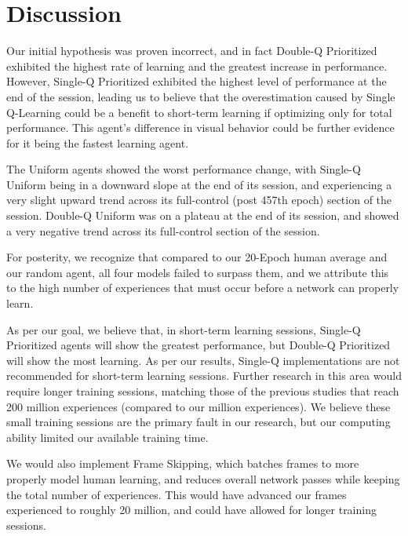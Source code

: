 \documentclass[conference]{IEEEtran}
\begin{document}
\section{Discussion}
Our initial hypothesis was proven incorrect, and in fact Double-Q Prioritized exhibited the highest rate of learning and the greatest increase in performance. However, Single-Q Prioritized exhibited the highest level of performance at the end of the session, leading us to believe that the overestimation caused by Single Q-Learning could be a benefit to short-term learning if optimizing only for total performance. This agent's difference in visual behavior could be further evidence for it being the fastest learning agent. \par
The Uniform agents showed the worst performance change, with Single-Q Uniform being in a downward slope at the end of its session, and experiencing a very slight upward trend across its full-control (post 457th epoch) section of the session. Double-Q Uniform was on a plateau at the end of its session, and showed a very negative trend across its full-control section of the session. \par
For posterity, we recognize that compared to our 20-Epoch human average and our random agent, all four models failed to surpass them, and we attribute this to the high number of experiences that must occur before a network can properly learn. \par
As per our goal, we believe that, in short-term learning sessions, Single-Q Prioritized agents will show the greatest performance, but Double-Q Prioritized will show the most learning. As per our results, Single-Q implementations are not recommended for short-term learning sessions.
Further research in this area would require longer training sessions, matching those of the previous studies that reach 200 million experiences (compared to our  million experiences). We believe these small training sessions are the primary fault in our research, but our computing ability limited our available training time. \par
We would also implement Frame Skipping, which batches frames to more properly model human learning, and reduces overall network passes while keeping the total number of experiences. This would have advanced our frames experienced to roughly 20 million, and could have allowed for longer training sessions.\par
\end{document}
